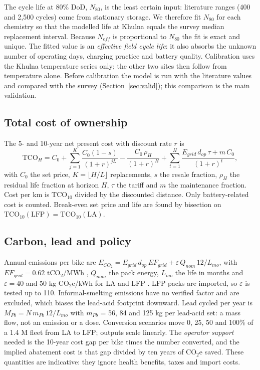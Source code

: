 The cycle life at 80\% DoD, $N_{80}$, is the least certain input: literature ranges (400 and 2{,}500 cycles) come from stationary storage. We therefore fit $N_{80}$ for each chemistry so that the modelled life at Khulna equals the survey median replacement interval. Because $N_{eff}$ is proportional to $N_{80}$ the fit is exact and unique. The fitted value is an \emph{effective field cycle life}: it also absorbs the unknown number of operating days, charging practice and battery quality. Calibration uses the Khulna temperature series only; the other two sites then follow from temperature alone. Before calibration the model is run with the literature values and compared with the survey (Section~\ref{sec:valid}); this comparison is the main validation.

\subsection{Total cost of ownership}
The 5- and 10-year net present cost with discount rate $r$ is
\begin{equation}
\mathrm{TCO}_H=C_0+\sum_{j=1}^{K}\frac{C_0(1-s)}{(1+r)^{jL}}-\frac{C_0\,\rho_H}{(1+r)^{H}}+\sum_{t=1}^{H}\frac{E_{grid}\,d_{op}\,\tau + m\,C_0}{(1+r)^t},
\end{equation}
with $C_0$ the set price, $K=\lfloor H/L\rfloor$ replacements, $s$ the resale fraction, $\rho_H$ the residual life fraction at horizon $H$, $\tau$ the tariff and $m$ the maintenance fraction. Cost per km is $\mathrm{TCO}_{10}$ divided by the discounted distance. Only battery-related cost is counted. Break-even set price and life are found by bisection on $\mathrm{TCO}_{10}(\mathrm{LFP})=\mathrm{TCO}_{10}(\mathrm{LA})$.

\subsection{Carbon, lead and policy}
Annual emissions per bike are $E_{CO_2}=E_{grid}\,d_{op}\,EF_{grid}+\varepsilon\,Q_{nom}\,12/L_{mo}$, with $EF_{grid}=0.62$ tCO$_2$/MWh \cite{doe_gef}, $Q_{nom}$ the pack energy, $L_{mo}$ the life in months and $\varepsilon=40$ and 50 kg CO$_2$e/kWh for LA and LFP \cite{jasper2025}. LFP packs are imported, so $\varepsilon$ is tested up to 110. Informal-smelting emissions have no verified factor and are excluded, which biases the lead-acid footprint downward. Lead cycled per year is $M_{Pb}=N\,m_{Pb}\,12/L_{mo}$ with $m_{Pb}$ = 56, 84 and 125 kg per lead-acid set: a mass flow, not an emission or a dose. Conversion scenarios move 0, 25, 50 and 100\% of a 1.4 M fleet from LA to LFP; outputs scale linearly. The \emph{operator support} needed is the 10-year cost gap per bike times the number converted, and the implied abatement cost is that gap divided by ten years of CO$_2$e saved. These quantities are indicative: they ignore health benefits, taxes and import costs.

